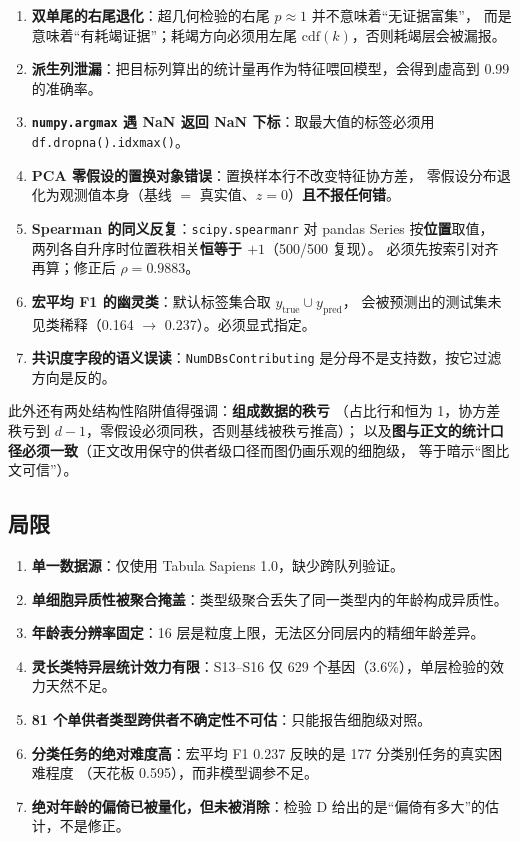 \documentclass{cjc}
\newcommand{\code}[1]{\texttt{\small #1}}
\begin{document}
\begin{enumerate}[label=(\arabic*)]
  \item \textbf{双单尾的右尾退化}：超几何检验的右尾 $p \approx 1$ 并不意味着“无证据富集”，
        而是意味着“有耗竭证据”；耗竭方向必须用左尾 $\mathrm{cdf}(k)$，否则耗竭层会被漏报。
  \item \textbf{派生列泄漏}：把目标列算出的统计量再作为特征喂回模型，会得到虚高到 0.99 的准确率。
  \item \textbf{\texttt{numpy.argmax} 遇 NaN 返回 NaN 下标}：取最大值的标签必须用
        \code{df.dropna().idxmax()}。
  \item \textbf{PCA 零假设的置换对象错误}：置换样本行不改变特征协方差，
        零假设分布退化为观测值本身（基线 $=$ 真实值、$z = 0$）\textbf{且不报任何错}。
  \item \textbf{Spearman 的同义反复}：\texttt{scipy.spearmanr} 对 pandas Series 按\textbf{位置}取值，
        两列各自升序时位置秩相关\textbf{恒等于 $+1$}（500/500 复现）。
        必须先按索引对齐再算；修正后 $\rho = 0.9883$。
  \item \textbf{宏平均 F1 的幽灵类}：默认标签集合取 $y_{\text{true}} \cup y_{\text{pred}}$，
        会被预测出的测试集未见类稀释（0.164 $\to$ 0.237）。必须显式指定。
  \item \textbf{共识度字段的语义误读}：\texttt{NumDBsContributing} 是分母不是支持数，按它过滤方向是反的。
\end{enumerate}

此外还有两处结构性陷阱值得强调：\textbf{组成数据的秩亏}
（占比行和恒为 1，协方差秩亏到 $d-1$，零假设必须同秩，否则基线被秩亏推高）；
以及\textbf{图与正文的统计口径必须一致}（正文改用保守的供者级口径而图仍画乐观的细胞级，
等于暗示“图比文可信”）。

\subsection{局限}

\begin{enumerate}[label=(\arabic*)]
  \item \textbf{单一数据源}：仅使用 Tabula Sapiens 1.0，缺少跨队列验证。
  \item \textbf{单细胞异质性被聚合掩盖}：类型级聚合丢失了同一类型内的年龄构成异质性。
  \item \textbf{年龄表分辨率固定}：16 层是粒度上限，无法区分同层内的精细年龄差异。
  \item \textbf{灵长类特异层统计效力有限}：S13--S16 仅 629 个基因（3.6\%），单层检验的效力天然不足。
  \item \textbf{81 个单供者类型跨供者不确定性不可估}：只能报告细胞级对照。
  \item \textbf{分类任务的绝对难度高}：宏平均 F1 0.237 反映的是 177 分类别任务的真实困难程度
        （天花板 0.595），而非模型调参不足。
  \item \textbf{绝对年龄的偏倚已被量化，但未被消除}：检验 D 给出的是“偏倚有多大”的估计，不是修正。
\end{enumerate}
\end{document}
